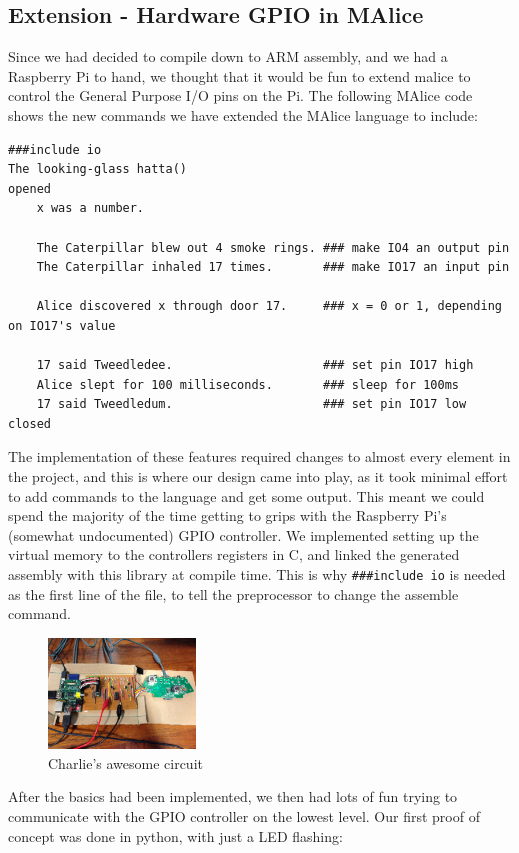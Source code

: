 \documentclass[11pt, notitlepage]{report}
\begin{document}
\subsection*{Extension - Hardware GPIO in MAlice}
Since we had decided to compile down to ARM assembly, and we had a Raspberry Pi to hand, we thought that it would be fun to extend malice to control the General Purpose I/O pins on the Pi. The following MAlice code shows the new commands we have extended the MAlice language to include:

\begin{verbatim}
###include io
The looking-glass hatta()
opened
    x was a number.

    The Caterpillar blew out 4 smoke rings. ### make IO4 an output pin
    The Caterpillar inhaled 17 times.       ### make IO17 an input pin

    Alice discovered x through door 17.     ### x = 0 or 1, depending on IO17's value

    17 said Tweedledee.                     ### set pin IO17 high
    Alice slept for 100 milliseconds.       ### sleep for 100ms
    17 said Tweedledum.                     ### set pin IO17 low
closed
\end{verbatim}

The implementation of these features required changes to almost every element in the project, and this is where our design came into play, as it took minimal effort to add commands to the language and get some output. This meant we could spend the majority of the time getting to grips with the Raspberry Pi's (somewhat undocumented) GPIO controller. We implemented setting up the virtual memory to the controllers registers in C, and linked the generated assembly with this library at compile time. This is why \texttt{\#\#\#include io} is needed as the first line of the file, to tell the preprocessor to change the assemble command.

\begin{figure}
  \vspace{-20pt}
  \begin{center}
    \includegraphics[width=0.35\textwidth]{IMG_9457.JPG}
    \caption{Charlie's awesome circuit}
  \end{center}
  \vspace{-10pt}
\end{figure}
After the basics had been implemented, we then had lots of fun trying to communicate with the GPIO controller on the lowest level. Our first proof of concept was done in python, with just a LED flashing:
\end{document}
